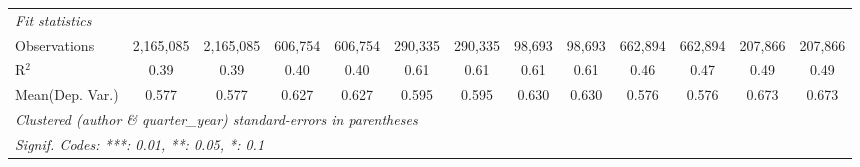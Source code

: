 \begin{tabular}{lcccccccccccc}
   \midrule
   \emph{Fit statistics}\\
   Observations                             & 2,165,085     & 2,165,085    & 606,754       & 606,754      & 290,335     & 290,335        & 98,693      & 98,693         & 662,894      & 662,894       & 207,866       & 207,866\\  
   R$^2$                                    & 0.39          & 0.39         & 0.40          & 0.40         & 0.61        & 0.61           & 0.61        & 0.61           & 0.46         & 0.47          & 0.49          & 0.49\\  
Mean(Dep. Var.) & 0.577 & 0.577 & 0.627 & 0.627 & 0.595 & 0.595 & 0.630 & 0.630 & 0.576 & 0.576 & 0.673 & 0.673 \\
   \midrule \midrule
   \multicolumn{13}{l}{\emph{Clustered (author \& quarter\_year) standard-errors in parentheses}}\\
   \multicolumn{13}{l}{\emph{Signif. Codes: ***: 0.01, **: 0.05, *: 0.1}}\\
\end{tabular}
\par\endgroup
